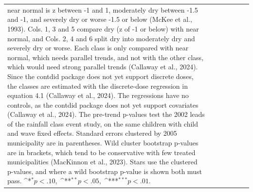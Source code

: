 \documentclass[12pt]{article}
\def\sym#1{\ifmmode^{#1}\else\(^{#1}\)\fi}
\begin{document}
\begin{longtable}{l*{6}{c}}
{near normal is z between -1 and 1, moderately dry between -1.5 and -1, and severely dry or worse -1.5 or below (McKee et al., 1993). Cols. 1, 3 and 5 compare dry (z of -1 or below) with near normal, and Cols. 2, 4 and 6 split dry into moderately dry and
severely dry or worse. Each class is only compared with near normal, which needs parallel trends, and not with the other class, which would need strong parallel trends (Callaway et al., 2024). Since the contdid package does not yet support discrete doses, the classes are estimated with the discrete-dose regression in equation 4.1 (Callaway et al., 2024). The regressions have no controls, as the contdid package does not yet support covariates (Callaway et al., 2024). The pre-trend p-values test the 2002 leads of the rainfall class event study, on the same children with child and wave fixed effects. Standard errors clustered by 2005 municipality are in parentheses.
Wild cluster bootstrap p-values are in brackets, which tend to be conservative with few treated municipalities (MacKinnon et al., 2023). Stars use the clustered p-values, and where a wild bootstrap p-value is shown both must pass. \mbox{\sym{*}\(p<.10\), \sym{**}\(p<.05\), \sym{***}\(p<.01\).}}\\
\end{longtable}
\endgroup
\clearpage
\begingroup
\footnotesize
\renewcommand{\arraystretch}{0.86}
\setlength{\tabcolsep}{4pt}
\setlength{\LTcapwidth}{\textwidth}
\end{document}
